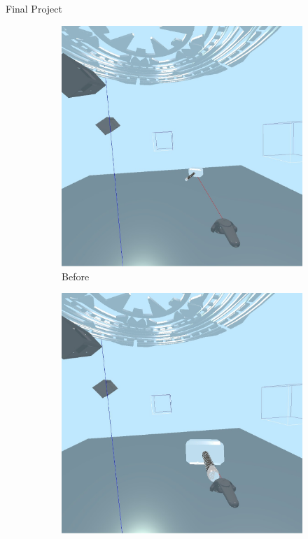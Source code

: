 \documentclass[final]{beamer}
\newlength{\onecolwid}
\begin{document}
\begin{frame}[t]
\begin{columns}[t]
\begin{column}{\onecolwid}
\begin{block}{Final Project}
\begin{itemize}
                            \begin{figure}[H]
                                \centering
                                \begin{subfigure}{0.5\linewidth}
                                    \centering
                                    \includegraphics[width=0.95\linewidth]{../report/screenshots/yank_a.jpg}
                                    \caption{Before}
                                \end{subfigure}%
                                \begin{subfigure}{0.5\linewidth}
                                    \centering
                                    \includegraphics[width=0.95\linewidth]{../report/screenshots/yank_b.jpg}

\end{subfigure}
\end{figure}
\end{itemize}
\end{block}
\end{column}
\end{columns}
\end{frame}
\end{document}
